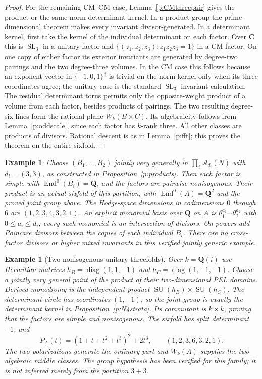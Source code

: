 \documentclass[11pt,reqno]{article}
\theoremstyle{emphasizedplain}
\theoremstyle{emphasizeddefinition}
\newtheorem{example}[theorem]{Example}
\theoremstyle{emphasizeddefinition}
\DeclareMathOperator{\End}{End}
\DeclareMathOperator{\SL}{SL}
\DeclareMathOperator{\SU}{SU}
\newcommand{\Q}{\mathbf Q}
\newcommand{\C}{\mathbf C}
\begin{document}
\begin{proof}
For the remaining CM--CM case, Lemma~\ref{p:CMthreepair} gives the
product or the same norm-determinant kernel. In a product group the
prime-dimensional theorem makes every invariant divisor-generated.
In a determinant kernel, first take the kernel of the individual
determinant on each factor. Over $\C$ this is $\SL_3$ in a unitary
factor and $\{(z_1,z_2,z_3):z_1z_2z_3=1\}$ in a CM factor.
On one copy of either factor its exterior invariants are generated by
degree-two pairings and the two degree-three volumes. In the CM case
this follows because an exponent vector in $\{-1,0,1\}^3$ is trivial
on the norm kernel only when its three coordinates agree; the unitary
case is the standard $\SL_3$ invariant calculation.
The residual determinant torus permits only the opposite-weight
product of a volume from each factor, besides products of pairings.
The two resulting degree-six lines form the rational plane
$W_k(B\times C)$. Its algebraicity follows from
Lemma~\ref{p:oddscale}, since each factor has $k$-rank three.
All other classes are products of divisors. Rational descent is as in
Lemma~\ref{p:fft}; this proves the theorem on the entire sixfold.
\end{proof}
\begin{example}
Choose $(B_1,\ldots,B_{2})$ jointly very generally in
$\prod_i\mathcal A_{d_i}(N)$ with $d_i=(3,3)$,
as constructed in Proposition~\ref{p:products}. Then each factor is
simple with $\End^0(B_i)=\Q$, and the factors are pairwise nonisogenous.
Their product is an actual sixfold of this partition, with
$\End^0(A)=\Q^{2}$ and the proved joint group above.
The Hodge-space dimensions in codimensions $0$ through $6$ are
$(1,2,3,4,3,2,1)$.
An explicit monomial basis over $\Q$ on $A$ is
$\theta_1^{a_1}\cdots\theta_{2}^{a_{2}}$ with
$0\leq a_i\leq d_i$; every such monomial is an intersection of divisors.
On powers add Poincare divisors between the copies of each individual
$B_i$. There are no cross-factor divisors or higher mixed invariants in
this verified jointly generic example.
\end{example}
\begin{example}[Two nonisogenous unitary threefolds]
Over $k=\Q(i)$ use Hermitian matrices
$h_B=\operatorname{diag}(1,1,-1)$ and
$h_C=\operatorname{diag}(1,-1,-1)$. Choose a jointly very general point
of the product of their two-dimensional PEL domains.
Derived monodromy is the independent product $\SU(h_B)\times\SU(h_C)$.
The determinant circle has coordinates $(1,-1)$, so the joint group
is exactly the determinant kernel in Proposition~\ref{p:N4strata}.
Its commutant is $k\times k$, proving that the factors are simple
and nonisogenous. The sixfold has split determinant $-1$, and
\[
 P_A(t)=(1+t+t^2+t^3)^2+2t^3,
 \qquad (1,2,3,6,3,2,1).
\]
The two polarizations generate the ordinary part and $W_k(A)$ supplies
the two algebraic middle classes. The group hypothesis has been verified
for this family; it is not inferred merely from the partition $3+3$.
\end{example}
\end{document}
